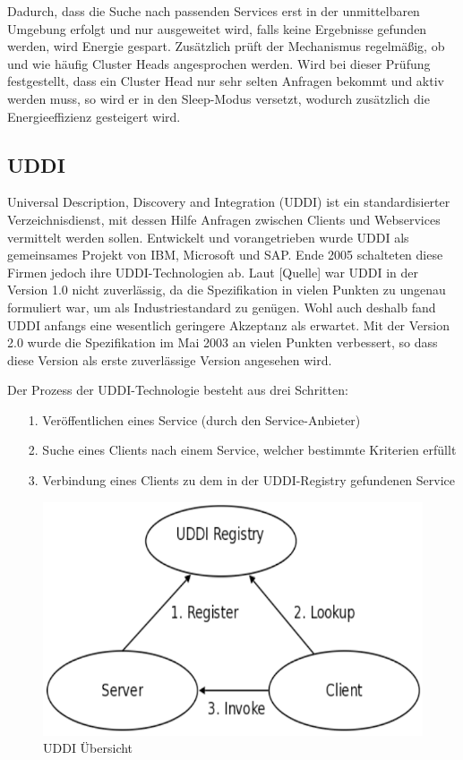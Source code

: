 \documentclass[conference,compsoc]{IEEEtran}
\begin{document}
Dadurch, dass die Suche nach passenden Services erst in der unmittelbaren Umgebung erfolgt und nur ausgeweitet wird, falls keine Ergebnisse gefunden werden, wird Energie gespart. Zusätzlich prüft der Mechanismus regelmäßig, ob und wie häufig Cluster Heads angesprochen werden. Wird bei dieser Prüfung festgestellt, dass ein Cluster Head nur sehr selten Anfragen bekommt und aktiv werden muss, so wird er in den Sleep-Modus versetzt, wodurch zusätzlich die Energieeffizienz gesteigert wird.

\subsection{UDDI}

Universal Description, Discovery and Integration (UDDI) ist ein standardisierter Verzeichnisdienst, mit dessen Hilfe Anfragen zwischen Clients und Webservices vermittelt werden sollen. Entwickelt und vorangetrieben wurde UDDI als gemeinsames Projekt von IBM, Microsoft und SAP. Ende 2005 schalteten diese Firmen jedoch ihre UDDI-Technologien ab.
Laut [Quelle] war UDDI in der Version 1.0 nicht zuverlässig, da die Spezifikation in vielen Punkten zu ungenau formuliert war, um als Industriestandard zu genügen. Wohl auch deshalb fand UDDI anfangs eine wesentlich geringere Akzeptanz als erwartet. Mit der Version 2.0 wurde die Spezifikation im Mai 2003 an vielen Punkten verbessert, so dass diese Version als erste zuverlässige Version angesehen wird.

Der Prozess der UDDI-Technologie besteht aus drei Schritten:
\begin{itemize}
\item[1.] Veröffentlichen eines Service (durch den Service-Anbieter)
\item[2.] Suche eines Clients nach einem Service, welcher bestimmte Kriterien erfüllt
\item[3.] Verbindung eines Clients zu dem in der UDDI-Registry gefundenen Service
\end{itemize}

\begin{figure}
\centering
\includegraphics[scale=0.45]{UDDI.png}
\caption{UDDI Übersicht}
\label{UDDIBild}
\end{figure}
\end{document}
